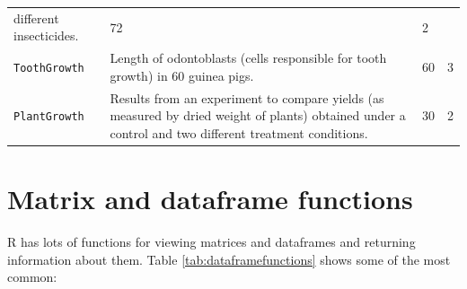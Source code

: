 \documentclass[]{book}
\theoremstyle{definition}
\theoremstyle{definition}
\theoremstyle{remark}
\begin{document}
\begin{longtable}[]{@{}llll@{}}
\begin{minipage}[t]{0.38\columnwidth}
different insecticides.\strut
\end{minipage} & \begin{minipage}[t]{0.07\columnwidth}\raggedright\strut
72\strut
\end{minipage} & \begin{minipage}[t]{0.09\columnwidth}\raggedright\strut
2\strut
\end{minipage}\tabularnewline
\begin{minipage}[t]{0.16\columnwidth}\raggedright\strut
\texttt{ToothGrowth}\strut
\end{minipage} & \begin{minipage}[t]{0.38\columnwidth}\raggedright\strut
Length of odontoblasts (cells responsible for tooth growth) in 60 guinea
pigs.\strut
\end{minipage} & \begin{minipage}[t]{0.07\columnwidth}\raggedright\strut
60\strut
\end{minipage} & \begin{minipage}[t]{0.09\columnwidth}\raggedright\strut
3\strut
\end{minipage}\tabularnewline
\begin{minipage}[t]{0.16\columnwidth}\raggedright\strut
\texttt{PlantGrowth}\strut
\end{minipage} & \begin{minipage}[t]{0.38\columnwidth}\raggedright\strut
Results from an experiment to compare yields (as measured by dried
weight of plants) obtained under a control and two different treatment
conditions.\strut
\end{minipage} & \begin{minipage}[t]{0.07\columnwidth}\raggedright\strut
30\strut
\end{minipage} & \begin{minipage}[t]{0.09\columnwidth}\raggedright\strut
2\strut
\end{minipage}\tabularnewline
\bottomrule
\end{longtable}

\section{Matrix and dataframe
functions}\label{matrix-and-dataframe-functions}

R has lots of functions for viewing matrices and dataframes and
returning information about them. Table \ref{tab:dataframefunctions}
shows some of the most common:
\end{document}
